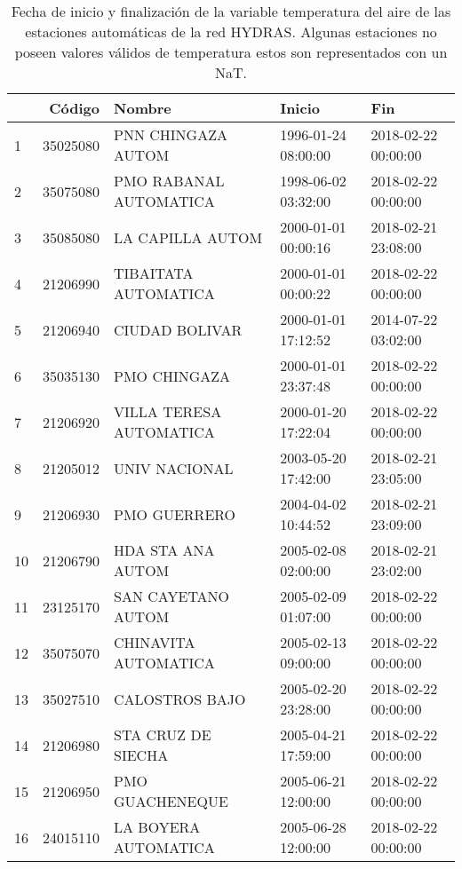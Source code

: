 \begin{table}[h]
\centering
\caption{Fecha de inicio y finalización de la variable temperatura del aire de las estaciones automáticas de la red HYDRAS. Algunas estaciones no poseen valores válidos de temperatura estos son representados con un NaT.}
\label{tab:hydras_inicio_fin}
\begin{tabular}{lrlll}

\toprule
{} &       Código &                   Nombre &              Inicio &                 Fin \\
\midrule
1  &  35025080 &       PNN CHINGAZA AUTOM & 1996-01-24 08:00:00 & 2018-02-22 00:00:00 \\
2  &  35075080 &   PMO RABANAL AUTOMATICA & 1998-06-02 03:32:00 & 2018-02-22 00:00:00 \\
3  &  35085080 &         LA CAPILLA AUTOM & 2000-01-01 00:00:16 & 2018-02-21 23:08:00 \\
4  &  21206990 &     TIBAITATA AUTOMATICA & 2000-01-01 00:00:22 & 2018-02-22 00:00:00 \\
5  &  21206940 &           CIUDAD BOLIVAR & 2000-01-01 17:12:52 & 2014-07-22 03:02:00 \\
6  &  35035130 &             PMO CHINGAZA & 2000-01-01 23:37:48 & 2018-02-22 00:00:00 \\
7  &  21206920 &  VILLA TERESA AUTOMATICA & 2000-01-20 17:22:04 & 2018-02-22 00:00:00 \\
8  &  21205012 &            UNIV NACIONAL & 2003-05-20 17:42:00 & 2018-02-21 23:05:00 \\
9  &  21206930 &             PMO GUERRERO & 2004-04-02 10:44:52 & 2018-02-21 23:09:00 \\
10 &  21206790 &        HDA STA ANA AUTOM & 2005-02-08 02:00:00 & 2018-02-21 23:02:00 \\
11 &  23125170 &       SAN CAYETANO AUTOM & 2005-02-09 01:07:00 & 2018-02-22 00:00:00 \\
12 &  35075070 &     CHINAVITA AUTOMATICA & 2005-02-13 09:00:00 & 2018-02-22 00:00:00 \\
13 &  35027510 &           CALOSTROS BAJO & 2005-02-20 23:28:00 & 2018-02-22 00:00:00 \\
14 &  21206980 &       STA CRUZ DE SIECHA & 2005-04-21 17:59:00 & 2018-02-22 00:00:00 \\
15 &  21206950 &          PMO GUACHENEQUE & 2005-06-21 12:00:00 & 2018-02-22 00:00:00 \\
16 &  24015110 &     LA BOYERA AUTOMATICA & 2005-06-28 12:00:00 & 2018-02-22 00:00:00 \\

\end{tabular}
\end{table}
